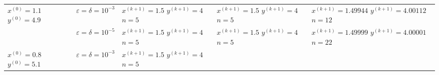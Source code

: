 \begin{table}[h!]
\begin{tabular}{|p{12ex}|l|p{20ex}|p{20ex}|p{20ex}|}
		\(x^{(0)} = 1.1 \) \newline \(y^{(0)} = 4.9\)              &                                                                                                               %
		\(\varepsilon = \delta = 10^{-3} \)                        &                                                                                                               %
		\(x^{(k+1)}=1.5\) \newline \(y^{(k+1)}=4\) \newline\(n=5\) &                                                                                                               %
		\(x^{(k+1)}=1.5\) \newline \(y^{(k+1)}=4\) \newline\(n=5\) &                                                                                                               %
		\(x^{(k+1)}=1.49944\) \newline \(y^{(k+1)}=4.00112\) \newline\(n=12\)                                                                                                      \\ \cline{2-5}
		                                                           & \(\varepsilon = \delta = 10^{-5} \) &                                                                         %
		\(x^{(k+1)}=1.5\) \newline \(y^{(k+1)}=4\) \newline\(n=5\) &                                                                                                               %
		\(x^{(k+1)}=1.5\) \newline \(y^{(k+1)}=4\) \newline\(n=5\) &                                                                                                               %
		\(x^{(k+1)}=1.49999\) \newline \(y^{(k+1)}=4.00001\) \newline\(n=22\)                                                                                                      \\ \hline
		\(x^{(0)} = 0.8\) \newline \(y^{(0)} = 5.1\)               &                                                                                                               %
		\(\varepsilon = \delta = 10^{-3} \)                        &                                                                                                               %
		\(x^{(k+1)}=1.5\) \newline \(y^{(k+1)}=4\) \newline\(n=5\) &                                                                                                               %

\end{tabular}
\end{table}

